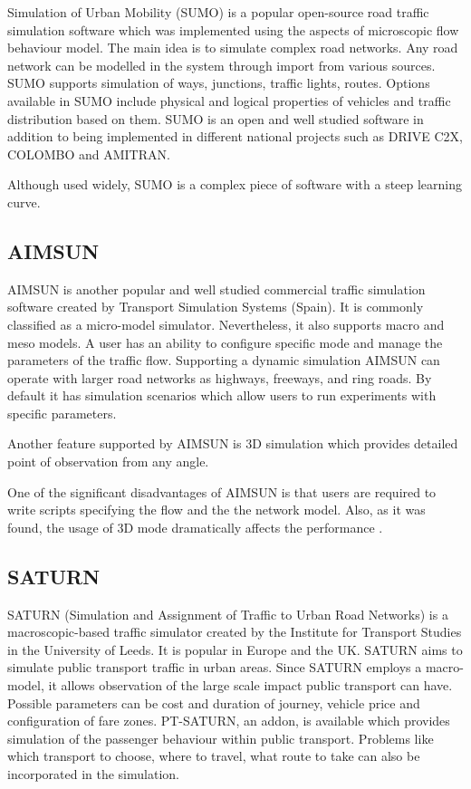Simulation of Urban Mobility (SUMO) is a popular open-source road traffic simulation software which was implemented using the aspects of microscopic flow behaviour model. The main idea is to simulate complex road networks. Any road network can be modelled in the system through import from various sources\cite{Ismail2012}. SUMO supports simulation of ways, junctions, traffic lights, routes. Options available in SUMO include physical and logical properties of vehicles and traffic distribution based on them. SUMO is an open and well studied software in addition to being implemented in different national projects such as DRIVE C2X, COLOMBO and AMITRAN\cite{TransportResearchattheGermanAerospaceCentre2016}.

Although used widely, SUMO is a complex piece of software with a steep learning curve\cite{Ismail2012}.

\subsection{AIMSUN}

AIMSUN is another popular and well studied commercial traffic simulation software created by Transport Simulation Systems (Spain). It is commonly classified as a micro-model simulator. Nevertheless, it also supports macro and meso models. A user has an ability to configure specific mode and manage the parameters of the traffic flow\cite{Hawick2009}. Supporting a dynamic simulation AIMSUN can operate with larger road networks as highways, freeways, and ring roads. By default it has simulation scenarios which allow users to run experiments with specific parameters.

Another feature supported by AIMSUN is 3D simulation which provides detailed point of observation from any angle.

One of the significant disadvantages of AIMSUN is that users are required to write scripts specifying the flow and the the network model. Also, as it was found, the usage of 3D mode dramatically affects the performance \cite{Hawick2009}.

\subsection{SATURN}

SATURN (Simulation and Assignment of Traffic to Urban Road Networks) is a macroscopic-based traffic simulator created by the Institute for Transport Studies in the University of Leeds. It is popular in Europe and the UK. SATURN aims to simulate public transport traffic in urban areas. Since SATURN employs a macro-model, it allows observation of the large scale impact public transport can have. Possible parameters can be cost and duration of journey, vehicle price and configuration of fare zones. PT-SATURN, an addon, is available which provides simulation of the passenger behaviour within public transport. Problems like which transport to choose, where to travel, what route to take can also be incorporated in the simulation\cite{Shires2006}.

